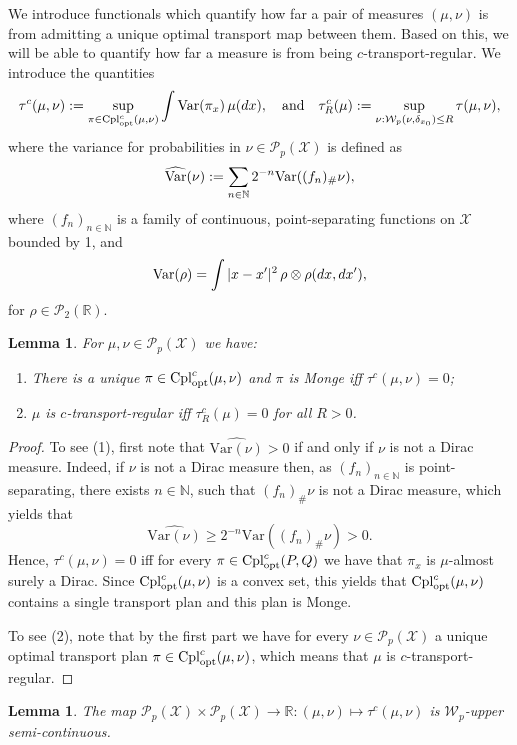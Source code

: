 \documentclass[a4paper]{amsart}
\numberwithin{theorem}{section}
\newtheorem{lemma}[theorem]{Lemma}
\theoremstyle{definition}
\newcommand{\N}{\mathbb{N}}
\newcommand{\R}{\mathbb{R}}
\newcommand{\cpl}{\textup{Cpl}}
\newcommand{\W}{\mathcal{W}}
\newcommand{\Pc}{\mathcal P}
\newcommand{\cplopt}{\cpl_{\rm opt}}
\newcommand{\var}[1]{\mathrm{Var}(#1)}
\begin{document}
We introduce functionals which quantify how far a pair of measures $(\mu,\nu)$ is from admitting a unique optimal transport map between them. Based on this, we will be able to quantify how far a measure is from being $c$-transport-regular. 
We introduce the quantities
\[
    \tau^c(\mu,\nu) := \sup_{ \pi \in \cplopt^c(\mu,\nu)} \int \var{\pi_x} \, \mu(dx), \quad \text{and} \quad \tau_R^c(\mu) := \sup_{\nu : \W_p(\nu,\delta_{x_0}) \le R}
    \tau(\mu,\nu),
\]
where the variance for probabilities in $\nu \in \Pc_p(\mathcal X)$ is defined as
\[
    \widehat{{\rm Var}}(\nu) := \sum_{n \in \N} 2^{-n} {\rm Var}((f_n)_\# \nu),
\]
where $(f_n)_{n \in \N}$ is a family of continuous, point-separating functions on $\mathcal X$ bounded by 1, and
\[
    {\rm Var}(\rho) = \int |x-x'|^2 \, \rho\otimes\rho(dx,dx'),
\]
for $\rho \in \mathcal P_2(\R)$.


\begin{lemma} \label{lem:apx.tauRegEquiv}
    For $\mu,\nu \in \Pc_p(\mathcal X)$ we have:
    \begin{enumerate}
        \item There is a unique $\pi \in \cplopt^c(\mu,\nu)$ and $\pi$ is Monge iff $\tau^c(\mu,\nu) = 0$;
        \item $\mu$ is $c$-transport-regular iff $\tau^c_R(\mu) = 0$ for all $R > 0$.
    \end{enumerate}
\end{lemma}

\begin{proof}
    To see (1), first note that $\widehat{\var{\nu}} > 0$ if and only if $\nu$ is not a Dirac measure. Indeed, if $\nu$ is not a Dirac measure then, as $(f_n)_{n \in \N}$ is point-separating, there exists $n \in \N$, such that $(f_n)_\# \nu$ is not a Dirac measure, which yields that
    \[
        \widehat{\var{\nu}} \ge 2^{-n} \var{(f_n)_\# \nu} > 0.
    \]
    Hence, $\tau^c(\mu,\nu) = 0$ iff for every $\pi \in \cplopt^c(P,Q)$ we have that $\pi_x$ is $\mu$-almost surely a Dirac.
    Since $\cplopt^c(\mu,\nu)$ is a convex set, this yields that $\cplopt^c(\mu,\nu)$ contains a single transport plan and this plan is Monge.

    To see (2), note that by the first part we have for every $\nu \in \Pc_p(\mathcal X)$ a unique optimal transport plan $\pi \in \cplopt^c(\mu,\nu)$, which means that $\mu$ is $c$-transport-regular.
\end{proof}

\begin{lemma} \label{lem:apx.tau_usc}
    The map $\Pc_p(\mathcal X) \times \Pc_p(\mathcal X) \to \R : (\mu,\nu) \mapsto \tau^c(\mu,\nu)$ is $\W_p$-upper semi-continuous.
\end{lemma}
\end{document}
